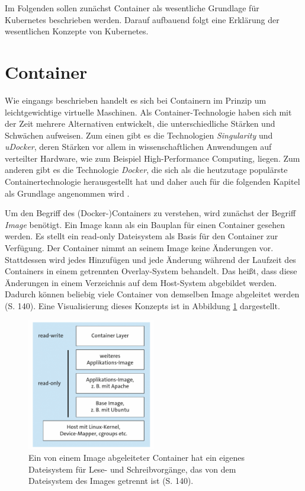 \documentclass[11pt,a4paper]{article}
\begin{document}
Im Folgenden sollen zunächst Container als wesentliche Grundlage für Kubernetes
beschrieben werden.
Darauf aufbauend folgt eine Erklärung der wesentlichen Konzepte von Kubernetes.

\section{Container}
\label{sec:Container}
Wie eingangs beschrieben handelt es sich bei Containern im Prinzip um leichtgewichtige virtuelle Maschinen.
Als Container-Technologie haben sich mit der Zeit mehrere Alternativen entwickelt, die unterschiedliche
Stärken und Schwächen aufweisen. Zum einen gibt es die Technologien \emph{Singularity} und \emph{uDocker}, deren Stärken
vor allem in wissenschaftlichen Anwendungen auf verteilter Hardware, wie zum Beispiel High-Performance Computing,
liegen. Zum anderen gibt es die Technologie \emph{Docker}, die sich als die heutzutage populärste Containertechnologie
herausgestellt hat und daher auch für die folgenden Kapitel als Grundlage angenommen wird \cite{Bentaleb_Belloum_Sebaa_El-Maouhab_2021}.

Um den Begriff des (Docker-)Containers zu verstehen, wird zunächst der Begriff \emph{Image} benötigt.
Ein Image kann als ein Bauplan für einen Container gesehen werden.
Es stellt ein read-only Dateisystem als Basis für den Container zur Verfügung. Der Container nimmt an seinem Image
keine Änderungen vor. Stattdessen wird jedes Hinzufügen und jede Änderung während der Laufzeit des Containers in einem
getrennten Overlay-System behandelt.
Das heißt, dass diese Änderungen in einem Verzeichnis auf dem Host-System abgebildet werden.
Dadurch können beliebig viele Container von demselben Image abgeleitet werden \cite{kofler2021docker} (S. 140).
Eine Visualisierung dieses Konzepts ist in Abbildung \ref{fig:overlay} dargestellt.

\begin{figure}[h]
  \centering
  \includegraphics[width=0.5\textwidth]{./media/kofler2021docker S.140.png}
  \caption{Ein von einem Image abgeleiteter Container hat ein eigenes Dateisystem für Lese- und Schreibvorgänge, das
    von dem Dateisystem des Images getrennt ist \cite{kofler2021docker} (S. 140).}
  \label{fig:overlay}
\end{figure}
\end{document}
